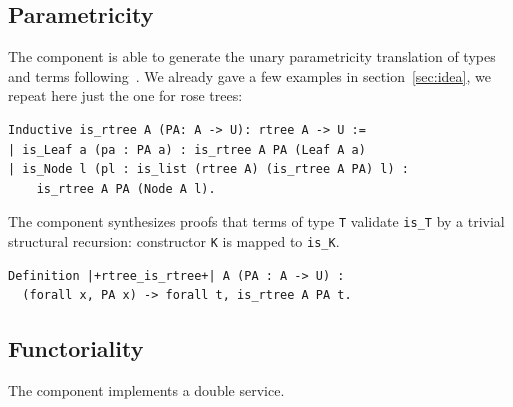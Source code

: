 \documentclass[sigplan,10pt,review]{acmart}\settopmatter{printfolios=true,printccs=false,printacmref=false}
\newcommand{\derive}[1]{\keys{#1}}
\begin{document}
\subsection{Parametricity} %

The \derive{pram1} component is able to generate the unary
parametricity translation of types and terms
following~\cite{keller:hal-00730913}. We already gave a few
examples in section~\ref{sec:idea}, we repeat here just the
one for rose trees:

\begin{minipage}{\textwidth}\begin{lstlisting}
Inductive is_rtree A (PA: A -> U): rtree A -> U :=
| is_Leaf a (pa : PA a) : is_rtree A PA (Leaf A a)
| is_Node l (pl : is_list (rtree A) (is_rtree A PA) l) :
    is_rtree A PA (Node A l).
\end{lstlisting}\end{minipage}

\noindent
The \derive{pram1P} component synthesizes proofs that terms
of type \lstinline+T+ validate \lstinline+is_T+ by a trivial
structural recursion: constructor \lstinline+K+ is mapped
to \lstinline+is_K+.

\begin{minipage}{\textwidth}\begin{lstlisting}
Definition |+rtree_is_rtree+| A (PA : A -> U) :
  (forall x, PA x) -> forall t, is_rtree A PA t.
\end{lstlisting}\end{minipage}



\subsection{Functoriality} %

The \derive{map} component implements a double service.
\end{document}
